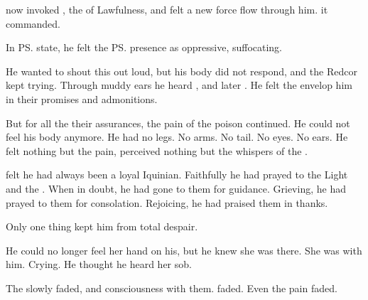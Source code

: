 \Camilienne{} now invoked , the \Sephirah{} of Lawfulness, and \Icor{} felt a new force flow through him. 
 it commanded. 

In \ps{\Icor}{} state, he felt the \ps{\sephirah} presence as oppressive, suffocating. 

He wanted to shout this out loud, but his body did not respond, and the Redcor \soror{} kept trying. 
Through muddy ears he heard , and later . 
He felt the \Sephiroth{} envelop him in their promises and admonitions. 

But for all the their assurances, the pain of the poison continued. 
He could not feel his body anymore. 
He had no legs. 
No arms. 
No tail. 
No eyes. 
No ears. 
He felt nothing but the pain, perceived nothing but the whispers of the \Archons. 

% 
% 

\Icor{} felt he had always been a loyal Iquinian. 
Faithfully he had prayed to the Light and the \Sephiroth. 
When in doubt, he had gone to them for guidance. 
Grieving, he had prayed to them for consolation. 
Rejoicing, he had praised them in thanks. 


Only one thing kept him from total despair. 

He could no longer feel her hand on his, but he knew she was there. 
She was with him. 
Crying. 
He thought he heard her sob. 


The \Sephiroth{} slowly faded, and consciousness with them. 
\Tiroco{} faded. 
Even the pain faded. 

